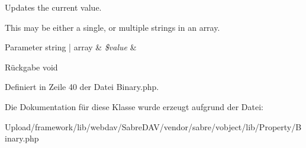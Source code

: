 Updates the current value.

This may be either a single, or multiple strings in an array.


\begin{DoxyParams}[1]{Parameter}
string | array & {\em \$value} & \\
\hline
\end{DoxyParams}
\begin{DoxyReturn}{Rückgabe}
void 
\end{DoxyReturn}


Definiert in Zeile 40 der Datei Binary.\+php.



Die Dokumentation für diese Klasse wurde erzeugt aufgrund der Datei\+:\begin{DoxyCompactItemize}
\item 
Upload/framework/lib/webdav/\+Sabre\+D\+A\+V/vendor/sabre/vobject/lib/\+Property/Binary.\+php\end{DoxyCompactItemize}
